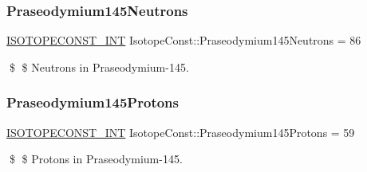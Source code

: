 \subsubsection{\texorpdfstring{Praseodymium145\+Neutrons}{Praseodymium145Neutrons}}
{\footnotesize\ttfamily \mbox{\hyperlink{group___isotope_const-_macros_ga5f18360b3e99483a35c32d789e62621c}{I\+S\+O\+T\+O\+P\+E\+C\+O\+N\+S\+T\+\_\+\+I\+NT}} Isotope\+Const\+::\+Praseodymium145\+Neutrons = 86}

\$ \$ Neutrons in Praseodymium-\/145. \mbox{\label{group___isotope_const-_praseodymium-_pr145_ga0b268dd7fa0b596b72338a12ac925892}} 
\subsubsection{\texorpdfstring{Praseodymium145\+Protons}{Praseodymium145Protons}}
{\footnotesize\ttfamily \mbox{\hyperlink{group___isotope_const-_macros_ga5f18360b3e99483a35c32d789e62621c}{I\+S\+O\+T\+O\+P\+E\+C\+O\+N\+S\+T\+\_\+\+I\+NT}} Isotope\+Const\+::\+Praseodymium145\+Protons = 59}

\$ \$ Protons in Praseodymium-\/145. 